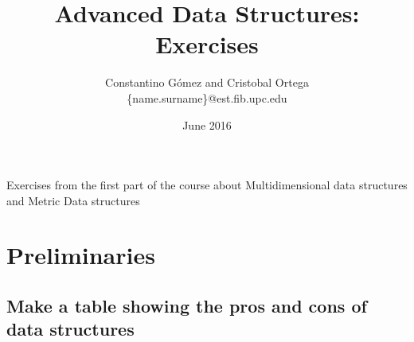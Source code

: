 \documentclass{article}
\title{Advanced Data Structures:\\Exercises}
\author{Constantino Gómez and Cristobal Ortega\\\{name.surname\}@est.fib.upc.edu}
\date{June 2016}
\begin{document}
\maketitle

Exercises from the first part of the course \citep{ads:slides_amalia} about Multidimensional data structures and Metric Data structures

\section{Preliminaries}

\subsection{Make a table showing the pros and cons of data structures}
\end{document}
